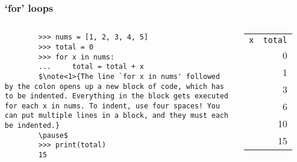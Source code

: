 \documentclass[notes]{beamer}
\begin{document}
\begin{frame}[fragile]
    \frametitle{`for' loops}
    
    \begin{columns}[c]
        \begin{lstlisting}
        >>> nums = [1, 2, 3, 4, 5]
        >>> total = 0
        >>> for x in nums:
        ...     total = total + x
        $\note<1>{The line `for x in nums' followed by the colon opens up a new block of code, which has to be indented. Everything in the block gets executed for each x in nums. To indent, use four spaces! You can put multiple lines in a block, and they must each be indented.}
        \pause$
        >>> print(total)
        15
        \end{lstlisting}
        
        \pause
        \begin{tabular}{l | r}
            \lstinline|x| & \lstinline|total| \\
            \, & 0 \\ \pause
            1 & 1 \\ \pause
            2 & 3 \\ \pause
            3 & 6 \\ \pause
            4 & 10 \\ \pause
            5 & 15 \\
        \end{tabular}
    \end{columns}
    
    
\end{frame}
\end{document}
